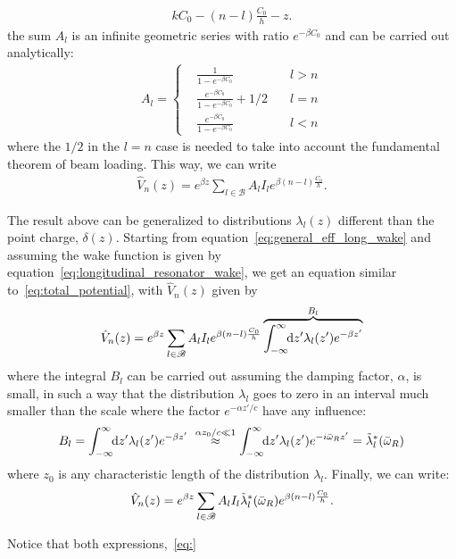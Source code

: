 \begin{apendicesenv}
\begin{align}
        kC_0 -(n-l)\frac{C_0}{h} - z.
    \end{align}
    the sum $A_l$ is an infinite geometric series with ratio $e^{-\beta C_0}$ and can be carried out analytically:
    \begin{align}
        A_l = \left\{\begin{aligned}
                        &\frac{1}{1-e^{-\beta C_0}}\quad &l>n\\
                        &\frac{e^{-\beta C_0}}{1-e^{-\beta C_0}} + 1/2 \quad &l=n\\
                        &\frac{e^{-\beta C_0}}{1-e^{-\beta C_0}}\quad &l<n
                     \end{aligned}
        \right.
    \end{align}
    where the $1/2$ in the $l=n$ case is needed to take into account the fundamental theorem of beam loading. This way, we can write
    \begin{align}\label{eq:}
        \hat{V}_n(z) = e^{\beta z}\sum_{l\in\mathscr{B}}A_l I_l e^{\beta(n-l)\frac{C_0}{h}}.
    \end{align}

    The result above can be generalized to distributions $\lambda_l(z)$ different than the point charge, $\delta(z)$. Starting from equation~\eqref{eq:general_eff_long_wake} and assuming the wake function is given by equation~\eqref{eq:longitudinal_resonator_wake}, we get an equation similar to~\eqref{eq:total_potential}, with $\hat{V}_n(z)$ given by
    \begin{align}
        \hat{V}_n(z) = e^{\beta z}\sum_{l\in\mathscr{B}}A_l I_l e^{\beta(n-l)\frac{C_0}{h}}
                    \overbrace{\int_{-\infty}^{\infty}\!\!\text{d}z' \lambda_l(z') e^{-\beta z'}}^{B_l}
    \end{align}
    where the integral $B_l$ can be carried out assuming the damping factor, $\alpha$, is small, in such a way that the distribution $\lambda_l$ goes to zero in an interval much smaller than the scale where the factor $e^{-\alpha z'/c}$ have any influence:
    \begin{align}
        B_l = \int_{-\infty}^{\infty}\!\!\text{d}z' \lambda_l(z') e^{-\beta z'}\,\, \overset{\alpha z_0/c \ll1}{\approx}
              \int_{-\infty}^{\infty}\!\!\text{d}z' \lambda_l(z') e^{-i\bar{\omega}_R z'} = \tilde{\lambda}^*_l(\bar{\omega}_R)
    \end{align}
    where $z_0$ is any characteristic length of the distribution $\lambda_l$. Finally, we can write:
    \begin{align}
        \hat{V}_n(z) = e^{\beta z}\sum_{l\in\mathscr{B}}A_l I_l \tilde{\lambda}^*_l(\bar{\omega}_R) e^{\beta(n-l)\frac{C_0}{h}}.
    \end{align}

    Notice that both expressions,~\eqref{eq:}

\end{apendicesenv}



